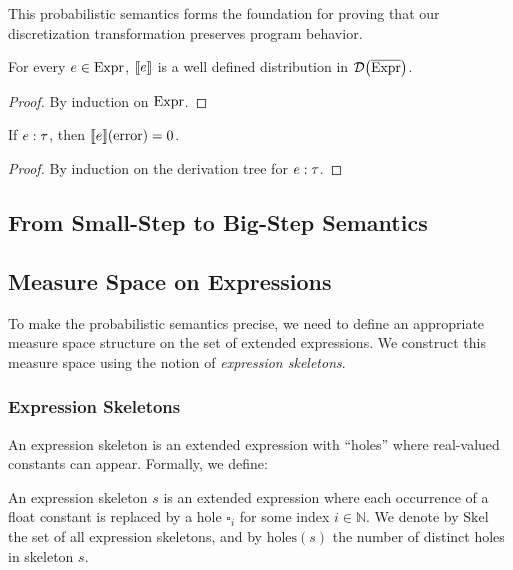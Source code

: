 This probabilistic semantics forms the foundation for proving that our discretization transformation preserves program behavior.
%
\begin{theorem}
	\label{thm:small-step-well-defined}
	For every $e \in \text{Expr}$, $\llbracket e \rrbracket$ is a well defined distribution in $\mathcal{D} \big( {\overline{\text{Expr}}} \big)$.
\end{theorem}
%
\begin{proof}
	By induction on $\text{Expr}$.
\end{proof}
%
%
\begin{theorem}
	\label{thm:small-step-well-typed}
	If $e : \tau$, then $\llbracket e \rrbracket({\text{error}}) = 0$.
\end{theorem}
%
\begin{proof}
	 By induction on the derivation tree for $e : \tau$.
\end{proof}

\subsection{From Small-Step to Big-Step Semantics}
%


\subsection{Measure Space on Expressions}

To make the probabilistic semantics precise, we need to define an appropriate measure space structure on the set of extended expressions. We construct this measure space using the notion of \emph{expression skeletons}.

\subsubsection{Expression Skeletons}

An expression skeleton is an extended expression with ``holes'' where real-valued constants can appear. Formally, we define:

\begin{definition}
An expression skeleton $s$ is an extended expression where each occurrence of a float constant is replaced by a hole $\square_i$ for some index $i \in \mathbb{N}$. We denote by $\text{Skel}$ the set of all expression skeletons, and by $\text{holes}(s)$ the number of distinct holes in skeleton $s$.
\end{definition}

